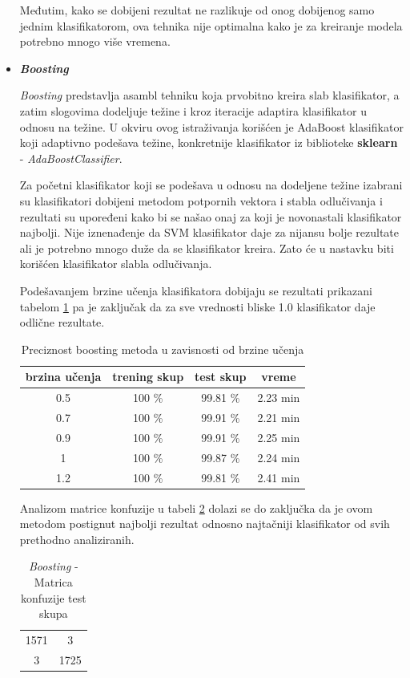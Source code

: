 \documentclass[a4paper]{article}
\begin{document}
\begin{itemize}
Međutim, kako se dobijeni rezultat ne razlikuje od onog dobijenog samo jednim klasifikatorom, ova tehnika nije optimalna kako je za kreiranje modela potrebno mnogo više vremena.


\item \textbf{\textit{Boosting}}

\textit{Boosting} predstavlja asambl tehniku koja prvobitno kreira slab klasifikator, a zatim slogovima dodeljuje težine i kroz iteracije adaptira klasifikator u odnosu na težine. U okviru ovog istraživanja korišćen je AdaBoost klasifikator koji adaptivno podešava težine, konkretnije klasifikator iz biblioteke \textbf{sklearn} - \textit{AdaBoostClassifier}.

Za početni klasifikator koji se podešava u odnosu na dodeljene težine izabrani su klasifikatori dobijeni metodom potpornih vektora i stabla odlučivanja i rezultati su upoređeni kako bi se našao onaj za koji je novonastali klasifikator najbolji. Nije iznenađenje da SVM klasifikator daje za nijansu bolje rezultate ali je potrebno mnogo duže da se klasifikator kreira. Zato će u nastavku biti korišćen klasifikator slabla odlučivanja. 

Podešavanjem brzine učenja klasifikatora dobijaju se rezultati prikazani tabelom \ref{table:boosttable}
pa je zaključak da za sve vrednosti bliske 1.0 klasifikator daje odlične rezultate.

\begin{table}[h!]
\centering
\begin{tabular}{|c c c c|} 
 \hline
  brzina učenja & trening skup & test skup & vreme 
  \\ [0.5ex] 
 \hline
 0.5 &  100 \% &  99.81 \% & 2.23 min \\
 0.7 &  100 \% &  99.91 \% & 2.21 min \\
 0.9 &  100 \% &  99.91 \% & 2.25 min \\
 1 & 100 \% & 99.87 \% & 2.24 min \\
 1.2 & 100 \% &  99.81 \% & 2.41 min \\

 \hline
\end{tabular}
\caption{Preciznost boosting metoda u zavisnosti od brzine učenja}
\label{table:boosttable}
\end{table}

Analizom matrice konfuzije u tabeli \ref{table:boostkonf} dolazi se do zaključka da je ovom metodom postignut najbolji rezultat odnosno najtačniji klasifikator od svih prethodno analiziranih.

\begin{table}[h!]
\centering
\begin{tabular}{|c c|}
  \hline
  1571 & 3 \\
  3 & 1725  \\
 \hline
\end{tabular}
\caption{\textit{Boosting} - Matrica konfuzije test skupa}
\label{table:boostkonf}
\end{table}
\newpage

\end{itemize}
\end{document}
